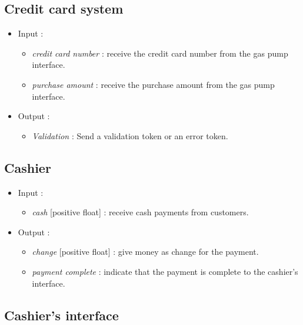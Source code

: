 \documentclass[11pt, a4paper]{article}
\newcommand{\data}[1]{\textit{#1}}
\begin{document}
\subsection{Credit card system}

\begin{itemize}
\item Input :
		\begin{itemize}
		\item \data{credit card number} : receive the credit card number from the gas pump interface.
		\item \data{purchase amount} : receive the purchase amount from the gas pump interface.
		\end{itemize}
\item Output :
    \begin{itemize}
    \item \data{Validation} : Send a validation token or an error token.
    \end{itemize}

\end{itemize}



\subsection{Cashier}

\begin{itemize}
\item Input :
		\begin{itemize}
		\item \data{cash} [positive float] : receive cash payments from customers.
		\end{itemize}

\item Output :
		\begin{itemize}
		\item \data{change} [positive float] : give money as change for the payment.
		\item \data{payment complete} : indicate that the payment is complete to the cashier's interface.
		\end{itemize}
\end{itemize}



\subsection{Cashier's interface}
\end{document}
